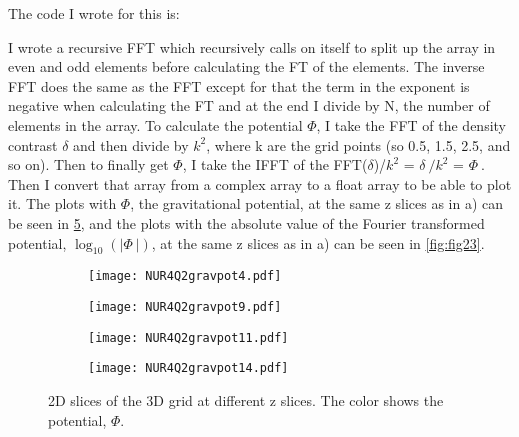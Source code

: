The code I wrote for this is:


I wrote a recursive FFT which recursively calls on itself to split up the array in even and odd elements before calculating the FT of the elements.
The inverse FFT does the same as the FFT except for that the term in the exponent is negative when calculating the FT and at the end I divide by N, the number of elements in the array. 
To calculate the potential $\Phi$, I take the FFT of the density contrast $\delta$ and then divide by $k^2$, where k are the grid points (so 0.5, 1.5, 2.5, and so on). 
Then to finally get $\Phi$, I take the IFFT of the FFT($\delta$)/$k^2$ = $\delta^{~}/k^2$ = $\Phi^{~}$. Then I convert that array from a complex array to a float array to be able to plot it.
The plots with $\Phi$, the gravitational potential, at the same z slices as in a) can be seen in \ref{fig:fig22}, and the plots with the absolute value of the Fourier transformed potential, $\log_{10}(|\Phi^{~}|)$, at the same z slices as in a) can be seen in \ref{fig:fig23}.

\begin{figure}[ht]
    \begin{subfigure}{.49\textwidth}
       \centering
    \texttt{[image: NUR4Q2gravpot4.pdf]}
    \centering
    \label{}
    \end{subfigure}
    \hfill
    \begin{subfigure}{.49\textwidth}
       \centering
    \texttt{[image: NUR4Q2gravpot9.pdf]}
    \centering
    \label{}
    \end{subfigure}
     \begin{subfigure}{.49\textwidth}
       \centering
    \texttt{[image: NUR4Q2gravpot11.pdf]}
    \centering
    \label{}
    \end{subfigure}
     \begin{subfigure}{.49\textwidth}
       \centering
    \texttt{[image: NUR4Q2gravpot14.pdf]}
    \centering
    \label{}
    \end{subfigure}
    \caption{2D slices of the 3D grid at different z slices. The color shows the potential, $\Phi$.}
    \label{fig:fig22}
\end{figure}

